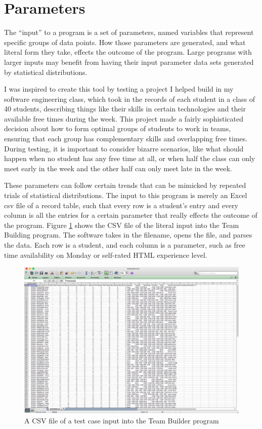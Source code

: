 \section{Parameters}
The ``input'' to a program is a set of parameters, named variables that represent specific groups of data points. How those parameters are generated, and what literal form they take, effects the outcome of the program. Large programs with larger inputs may benefit from having their input parameter data sets generated by statistical distributions.

I was inspired to create this tool by testing a project I helped build in my software engineering class, which took in the records of each student in a class of 40 students, describing things like their skills in certain technologies and their available free times during the week. This project made a fairly sophisticated decision about how to form optimal groups of students to work in teams, ensuring that each group has complementary skills and overlapping free times. During testing, it is important to consider bizarre scenarios, like what should happen when no student has any free time at all, or when half the class can only meet early in the week and the other half can only meet late in the week.

These parameters can follow certain trends that can be mimicked by repeated trials of statistical distributions. The input to this program is merely an Excel csv file of a record table, such that every row is a student's entry and every column is all the entries for a certain parameter that really effects the outcome of the program. Figure \ref{fig:teamfile} shows the CSV file of the literal input into the Team Building program. The software takes in the filename, opens the file, and parses the data. Each row is a student, and each column is a parameter, such as free time availability on Monday or self-rated HTML experience level.

\begin{figure}
\includegraphics[scale=0.3]{team-file.png}
\caption{A CSV file of a test case input into the Team Builder program}
\label{fig:teamfile}
\end{figure}

